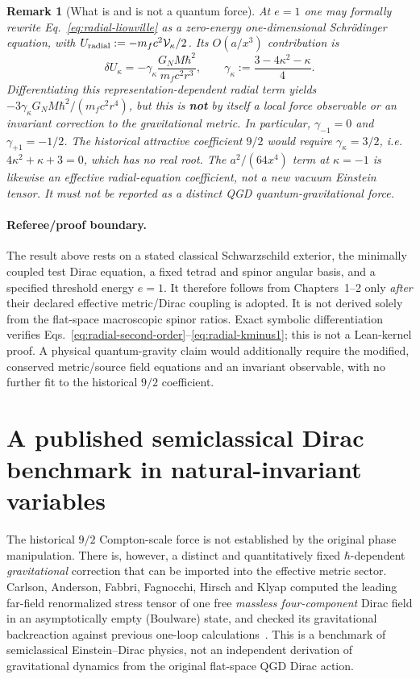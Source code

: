 \documentclass[11pt,a4paper]{article}
\newtheorem{remark}[theorem]{Remark}
\begin{document}
\begin{remark}[What is and is not a quantum force]
\label{rem:radial-not-force}
At $e=1$ one may \emph{formally} rewrite
Eq.~\eqref{eq:radial-liouville} as a zero-energy one-dimensional
Schr\"odinger equation, with
$U_{\rm radial}:=-m_fc^2\mathcal V_\kappa/2$.
Its $O(a/x^3)$ contribution is
\begin{equation}\label{eq:radial-gamma}
\delta U_\kappa=-\gamma_\kappa
\frac{G_NM\hbar^2}{m_fc^2r^3},\qquad
\gamma_\kappa:=\frac{3-4\kappa^2-\kappa}{4}.
\end{equation}
Differentiating this \emph{representation-dependent radial term} yields
$-3\gamma_\kappa G_NM\hbar^2/(m_fc^2r^4)$, but this is
\textbf{not} by itself a local force observable or an invariant
correction to the gravitational metric. In particular,
$\gamma_{-1}=0$ and $\gamma_{+1}=-1/2$. The historical 
\emph{attractive} coefficient $9/2$ would require
$\gamma_\kappa=3/2$, i.e.
$4\kappa^2+\kappa+3=0$, which has no real root.
The $a^2/(64x^4)$ term at $\kappa=-1$ is likewise an
\emph{effective radial-equation coefficient}, not a new vacuum
Einstein tensor. It must not be reported as a distinct QGD
quantum-gravitational force.
\end{remark}
\paragraph{Referee/proof boundary.}
The result above rests on a stated classical Schwarzschild exterior,
the minimally coupled test Dirac equation, a fixed tetrad and spinor
angular basis, and a specified threshold energy $e=1$. It therefore
follows from Chapters~1--2 only \emph{after} their declared effective
metric/Dirac coupling is adopted. It is not derived solely from the
flat-space macroscopic spinor ratios. Exact symbolic differentiation
verifies Eqs.~\eqref{eq:radial-second-order}--\eqref{eq:radial-kminus1};
this is not a Lean-kernel proof. A physical quantum-gravity claim
would additionally require the modified, conserved metric/source
field equations and an invariant observable, with no further fit
to the historical $9/2$ coefficient.


\section{A published semiclassical Dirac benchmark in natural-invariant variables}
\label{sec:diracbenchmark}
The historical $9/2$ Compton-scale force is not established by the
original phase manipulation.  There is, however, a distinct and
quantitatively fixed $\hbar$-dependent \emph{gravitational} correction
that can be imported into the effective metric sector.  Carlson,
Anderson, Fabbri, Fagnocchi, Hirsch and Klyap computed the leading
far-field renormalized stress tensor of one free \emph{massless
four-component} Dirac field in an asymptotically empty (Boulware)
state, and checked its gravitational backreaction against previous
one-loop calculations~\cite{Carlson2010}.  This is a benchmark of
semiclassical Einstein--Dirac physics, not an independent derivation
of gravitational dynamics from the original flat-space QGD Dirac action.
\end{document}
